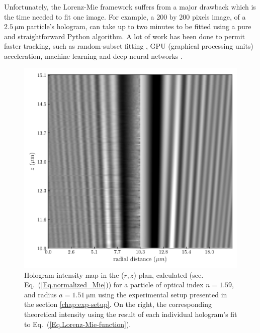 Unfortunately, the Lorenz-Mie framework suffers from a major drawback which is the time needed to fit one image. For example, a 200 by 200 pixels image, of a $2.5 ~ \mathrm{\mu m}$ particle's hologram, can take up to two minutes to be fitted using a pure and straightforward Python algorithm. A lot of work has been done to permit faster tracking, such as random-subset fitting \cite{dimiduk_random-subset_2014}, GPU (graphical processing units) acceleration, machine learning \cite{yevick_machine-learning_2014, hannel_machine-learning_2018} and deep neural networks \cite{altman_catch_2020}.

\begin{figure}[H]
	\centering
	\includegraphics{02_body/chapter2/images/test_tableau2.pdf}
	\caption{Hologram intensity map in the ($r,z$)-plan, calculated (see. Eq.~(\ref{Eq.normalized_Mie})) for a particle of optical index $n = 1.59$, and radius $a = 1.51 ~\mathrm{\mu m}$ using the experimental setup presented in the section \ref{chap:exp-setup}. On the right, the corresponding theoretical intensity using the result of each individual hologram's fit to Eq.~(\ref{Eq.Lorenz-Mie-function}).}
	\label{fig:holo_z_fit}
\end{figure}



